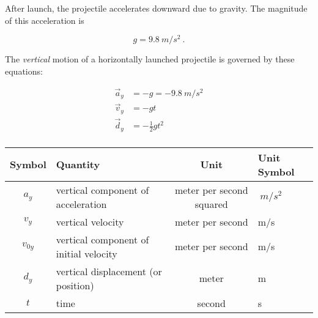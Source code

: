 \documentclass[main-physics.tex]{subfiles}
\begin{document}
\begin{mdframed}[backgroundcolor=black!10]
After launch, the projectile accelerates downward due to gravity. The magnitude of this acceleration is

\begin{equation*}
    g = \SI{9.8}{m/s^2}\ .
\end{equation*}
\end{mdframed}

\begin{mdframed}[backgroundcolor=black!10]
The \textit{vertical} motion of a horizontally launched projectile is governed by these equations:
\vspace{-1em}

\begin{align*}
    \vec{a}_y &= -g = -\SI{9.8}{m/s^2}\\
    \vec{v}_y &= - gt\\
    \vec{d}_y &= -\frac{1}{2} g t^2\\
\end{align*}
\vspace{-3em}

\begin{center}
    \begin{tabular}{cl|cl}
    \hline
    \textbf{Symbol} & \textbf{Quantity} & \textbf{Unit} & \textbf{Unit Symbol}  \\
    \hline\hline
        $a_y$ & vertical component of acceleration & meter per second squared & $\SI{}{m/s^2}$\\
        $v_y$ & vertical velocity & meter per second & m/s\\
        $v_{0y}$ & vertical component of initial velocity & meter per second & m/s\\
        $d_y$ & vertical displacement (or position) & meter & m\\
        $t$ & time & second & s\\
    \hline
    \end{tabular}
\end{center}
\end{mdframed}




\end{document}
